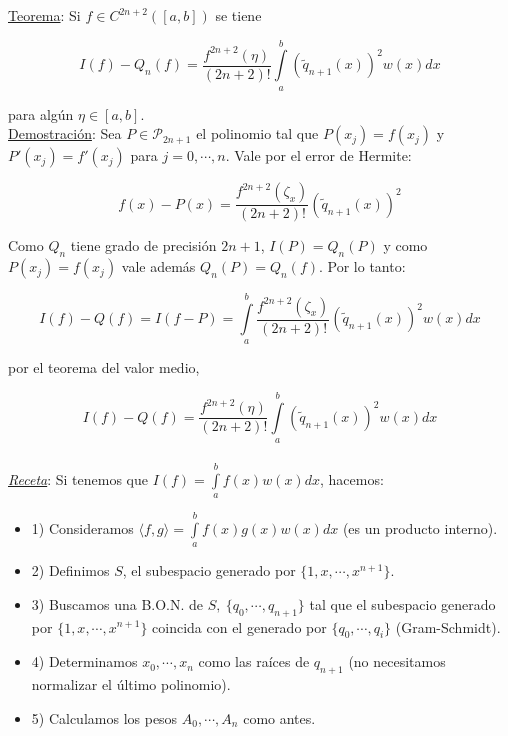 \underline{Teorema}: Si $f \in C^{2n + 2}([a, b])$ se tiene

$$I(f) - Q_{n}(f) = \frac{f^{2n + 2}(\eta)}{(2n + 2)!} \int \limits_{a}^{b} (\tilde{q}_{n + 1}(x))^{2}w(x)dx$$

para alg\'un $\eta \in [a, b]$.\\

\underline{Demostraci\'on}: Sea $P \in \mathcal{P}_{2n + 1}$ el polinomio tal que $P(x_{j}) = f(x_{j})$ y $P'(x_{j}) = f'(x_{j})$ para $j = 0, \cdots, n$. Vale por el error de Hermite:

$$f(x) - P(x) = \frac{f^{2n + 2}(\zeta_{x})}{(2n + 2)!}(\tilde{q}_{n + 1}(x))^{2}$$

Como $Q_{n}$ tiene grado de precisi\'on $2n + 1$, $I(P) = Q_{n}(P)$ y como $P(x_{j}) = f(x_{j})$ vale adem\'as $Q_{n}(P) = Q_{n}(f)$. Por lo tanto:

$$I(f) - Q(f) = I(f - P) = \int \limits_{a}^{b} \frac{f^{2n + 2}(\zeta_{x})}{(2n + 2)!}(\tilde{q}_{n + 1}(x))^{2}w(x)dx$$

por el teorema del valor medio,

$$I(f) - Q(f) = \frac{f^{2n + 2}(\eta)}{(2n + 2)!}\int \limits_{a}^{b} (\tilde{q}_{n + 1}(x))^{2}w(x)dx$$\\

\underline{\textit{Receta}}: Si tenemos que $I(f) = \int \limits_{a}^{b}
 f(x)w(x)dx$, hacemos:
 
\begin{itemize}
	\item 1) Consideramos $\langle f, g \rangle = \int \limits_{a}^{b} f(x)g(x)w(x)dx$ (es un producto interno).
	
	\item 2) Definimos $S$, el subespacio generado por $\{1, x, \cdots, x^{n + 1}\}$.
	
	\item 3) Buscamos una B.O.N. de $S,\ \{q_{0}, \cdots, q_{n + 1}\}$ tal que el subespacio generado por $\{1, x, \cdots, x^{n + 1}\}$ coincida con el generado por $\{q_{0}, \cdots, q_{i}\}$ (Gram-Schmidt).
	
	\item 4) Determinamos $x_{0}, \cdots, x_{n}$ como las ra\'ices de $q_{n + 1}$ (no necesitamos normalizar el \'ultimo polinomio).
	
	\item 5) Calculamos los pesos $A_{0}, \cdots, A_{n}$ como antes.\\
\end{itemize}

